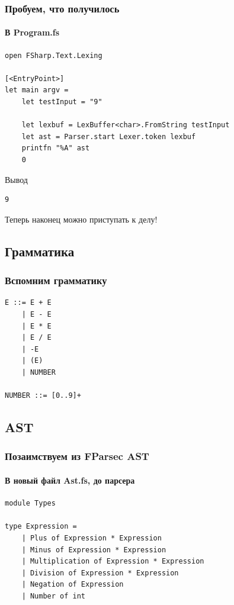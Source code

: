 \documentclass{../../slides-style}
\begin{document}
    \begin{frame}[fragile]
        \frametitle{Пробуем, что получилось}
        \framesubtitle{В Program.fs}
        \begin{small}
            \begin{verbatim}
open FSharp.Text.Lexing

[<EntryPoint>]
let main argv =
    let testInput = "9"

    let lexbuf = LexBuffer<char>.FromString testInput
    let ast = Parser.start Lexer.token lexbuf
    printfn "%A" ast
    0 
            \end{verbatim}
        \end{small}
        \begin{exampleblock}{Вывод}
            \begin{verbatim}
9
            \end{verbatim}
        \end{exampleblock}
        Теперь наконец можно приступать к делу!
    \end{frame}

    \subsection{Грамматика}

    \begin{frame}[fragile]
        \frametitle{Вспомним грамматику}
        \begin{verbatim}
E ::= E + E
    | E - E
    | E * E
    | E / E
    | -E
    | (E)
    | NUMBER

NUMBER ::= [0..9]+
        \end{verbatim}
    \end{frame}

    \subsection{AST}

    \begin{frame}[fragile]
        \frametitle{Позаимствуем из FParsec AST}
        \framesubtitle{В новый файл Ast.fs, до парсера}
        \begin{verbatim}
module Types

type Expression =
    | Plus of Expression * Expression
    | Minus of Expression * Expression
    | Multiplication of Expression * Expression
    | Division of Expression * Expression
    | Negation of Expression
    | Number of int
        \end{verbatim}
    \end{frame}
\end{document}
